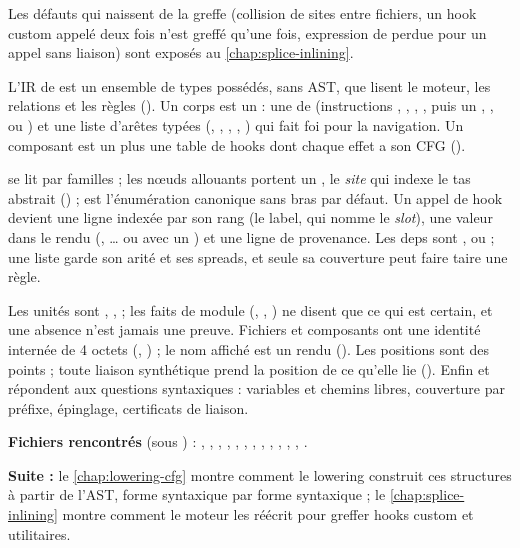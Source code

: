 Les défauts qui naissent de la greffe (collision de sites entre fichiers, un hook custom appelé deux fois n'est greffé qu'une fois, expression de  perdue pour un appel sans liaison) sont exposés au \cref{chap:splice-inlining}.

\begin{resume}
L'IR de \reactant{} est un ensemble de types possédés, sans AST, que lisent le moteur, les relations et les règles (). Un corps est un  : une  de  (instructions , , , , puis un  , ,  ou ) et une liste d'arêtes typées (, , , , ) qui fait foi pour la navigation. Un composant est un  plus une table de hooks dont chaque effet a son CFG ().

 se lit par familles ; les nœuds allouants portent un , le \emph{site} qui indexe le tas abstrait () ;  est l'énumération canonique sans bras par défaut. Un appel de hook devient une ligne  indexée par son rang (le label, qui nomme le \emph{slot}), une valeur dans le rendu (, \ldots{} ou  avec un ) et une ligne de provenance. Les deps sont ,  ou  ; une liste garde son arité et ses spreads, et seule sa couverture peut faire taire une règle.

Les unités sont , ,  ; les faits de module (, , ) ne disent que ce qui est certain, et une absence n'est jamais une preuve. Fichiers et composants ont une identité internée de 4 octets (, ) ; le nom affiché est un rendu (). Les positions sont des points  ; toute liaison synthétique prend la position de ce qu'elle lie (). Enfin  et  répondent aux questions syntaxiques : variables et chemins libres, couverture par préfixe, épinglage, certificats de liaison.

\textbf{Fichiers rencontrés} (sous ) : , , , , , , , , , , , , .

\textbf{Suite :} le \cref{chap:lowering-cfg} montre comment le lowering construit ces structures à partir de l'AST, forme syntaxique par forme syntaxique ; le \cref{chap:splice-inlining} montre comment le moteur les réécrit pour greffer hooks custom et utilitaires.
\end{resume}

